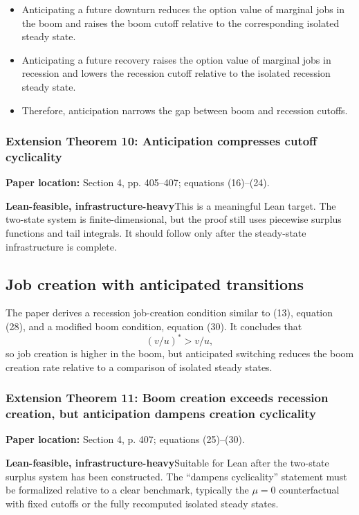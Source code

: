 \documentclass[11pt]{article}
\newcommand{\leaninfra}{\textcolor{darkamber}{\textbf{Lean-feasible, infrastructure-heavy}}}
\newcommand{\papersec}[1]{\textbf{Paper location:} #1}
\newcommand{\statusbox}[2]{\colorbox{#1}{\parbox{0.94\linewidth}{#2}}}
\begin{document}
\begin{itemize}
\item Anticipating a future downturn reduces the option value of marginal jobs in the boom and raises the boom cutoff relative to the corresponding isolated steady state.
\item Anticipating a future recovery raises the option value of marginal jobs in recession and lowers the recession cutoff relative to the isolated recession steady state.
\item Therefore, anticipation narrows the gap between boom and recession cutoffs.
\end{itemize}

\subsubsection*{Extension Theorem 10: Anticipation compresses cutoff cyclicality}
\papersec{Section 4, pp. 405--407; equations (16)--(24).}

\statusbox{softamber}{\leaninfra\quad This is a meaningful Lean target. The two-state system is finite-dimensional, but the proof still uses piecewise surplus functions and tail integrals. It should follow only after the steady-state infrastructure is complete.}

\subsection{Job creation with anticipated transitions}
The paper derives a recession job-creation condition similar to (13), equation (28), and a modified boom condition, equation (30). It concludes that
\[
(v/u)^*>v/u,
\]
so job creation is higher in the boom, but anticipated switching reduces the boom creation rate relative to a comparison of isolated steady states.

\subsubsection*{Extension Theorem 11: Boom creation exceeds recession creation, but anticipation dampens creation cyclicality}
\papersec{Section 4, p. 407; equations (25)--(30).}

\statusbox{softamber}{\leaninfra\quad Suitable for Lean after the two-state surplus system has been constructed. The ``dampens cyclicality'' statement must be formalized relative to a clear benchmark, typically the $\mu=0$ counterfactual with fixed cutoffs or the fully recomputed isolated steady states.}
\end{document}
